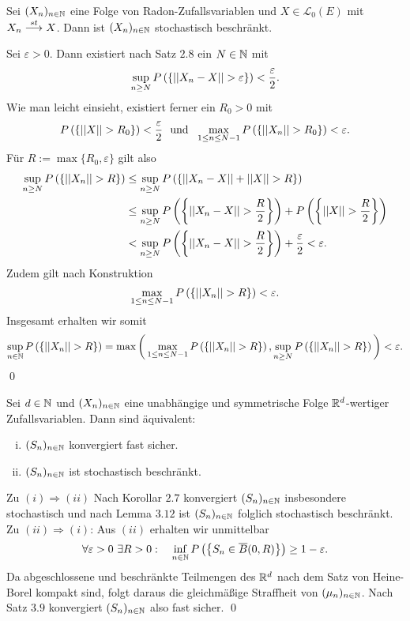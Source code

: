 \begin{lemma}
    Sei $(X_n)_{n \in \mathbb{N}}$ eine Folge von Radon-Zufallsvariablen und $X \in \mathcal{L}_0(E)$ mit $X_n \overset{st}{\longrightarrow} X$. Dann ist $(X_n)_{n \in \mathbb{N}}$ stochastisch beschränkt. 
\end{lemma}
\begin{proof*}
    Sei $\varepsilon > 0$. Dann existiert nach Satz $2.8$ ein $N \in \mathbb{N}$ mit 
    $$
        \sup_{n \geq N}P\left(\left\{ \lvert\lvert X_n - X \rvert\rvert > \varepsilon \right\}\right) < \frac{\varepsilon}{2}.
    $$
    Wie man leicht einsieht, existiert ferner ein $R_0 > 0$ mit 
    $$
        P\left(\left\{  \lvert\lvert X \rvert\rvert > R_0 \right\}\right) < \frac{\varepsilon}{2} \ \text{ und } \ \max_{1 \leq n \leq N-1}P\left(\left\{ \lvert\lvert X_n \rvert\rvert > R_0 \right\}\right) < \varepsilon.
    $$
    Für $R := \max\{R_0, \varepsilon\}$ gilt also 
    \begin{align*}
        \sup_{n \geq N}P\left(\left\{ \lvert\lvert X_n \rvert\rvert > R \right\}\right) &\leq \sup_{n \geq N}P\left(\left\{ \lvert\lvert X_n - X \rvert\rvert + \lvert\lvert X \rvert\rvert > R \right\}\right) \\\
                                            &\leq \sup_{n \geq N}P\left(\left\{ \lvert\lvert X_n - X \rvert\rvert > \frac{R}{2} \right\}\right) + P\left(\left\{ \lvert\lvert X \rvert\rvert > \frac{R}{2} \right\}\right) \\\
                                            &< \sup_{n \geq N}P\left(\left\{ \lvert\lvert X_n - X \rvert\rvert > \frac{R}{2} \right\}\right) + \frac{\varepsilon}{2} < \varepsilon. 
    \end{align*}
    Zudem gilt nach Konstruktion
    $$
        \max_{1\leq n \leq N-1}P\left(\left\{ \lvert\lvert X_n \rvert\rvert > R \right\}\right) < \varepsilon. 
    $$
    Insgesamt erhalten wir somit 
    $$
        \sup_{n \in \mathbb{N}} P\left(\left\{ \lvert\lvert X_n \rvert\rvert>R \right\}\right)= \max\bigg(\max_{1\leq n \leq N-1}P\left(\left\{ \lvert\lvert X_n \rvert\rvert > R \right\}\right),\sup_{n \geq N}P\left(\left\{ \lvert\lvert X_n \rvert\rvert> R \right\}\right)\bigg) < \varepsilon. 
    $$
    \qed 
\end{proof*}
\begin{corollary}
    Sei $d \in \mathbb{N}$ und $(X_n)_{n \in \mathbb{N}}$ eine unabhängige und symmetrische Folge $\mathbb{R}^d$-wertiger Zufallsvariablen. Dann sind äquivalent: 
    \begin{enumerate}[(i)]
        \item $(S_n)_{n \in \mathbb{N}}$ konvergiert fast sicher. 
        \item $(S_n)_{n \in \mathbb{N}}$ ist stochastisch beschränkt. 
    \end{enumerate} 
\end{corollary}
\begin{proof*}
    Zu $(i) \Rightarrow (ii)$ Nach Korollar $2.7$ konvergiert $(S_n)_{n \in \mathbb{N}}$ insbesondere stochastisch und nach Lemma $3.12$ ist $(S_n)_{n \in \mathbb{N}}$ folglich stochastisch beschränkt.   
    \newline Zu $(ii) \Rightarrow (i)$: Aus $(ii)$ erhalten wir unmittelbar
    $$
        \forall \varepsilon > 0 \ \exists R > 0: \quad \inf_{n \in \mathbb{N}}P\left(\left\{ S_n \in \overline{B}(0,R) \right\}\right) \geq 1 - \varepsilon.
    $$
    Da abgeschlossene und beschränkte Teilmengen des $\mathbb{R}^d$ nach dem Satz von Heine-Borel kompakt sind, folgt daraus die gleichmäßige Straffheit von $(\mu_n)_{n \in \mathbb{N}}$. 
    Nach Satz $3.9$ konvergiert $(S_n)_{n \in \mathbb{N}}$ also fast sicher. \qed 
\end{proof*}




